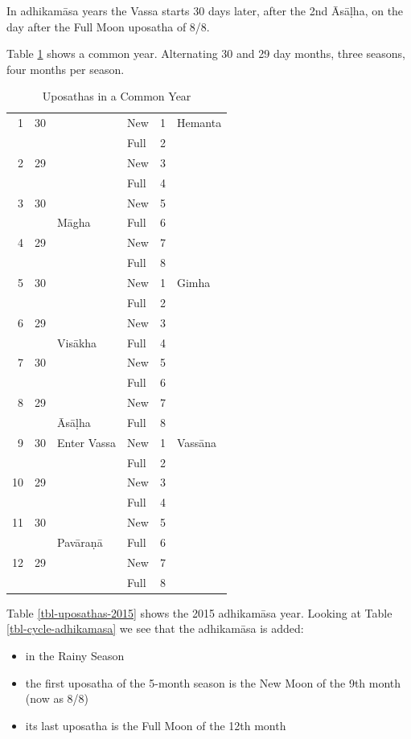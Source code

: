 \documentclass[11pt,oneside]{memoir-article}
\begin{document}
In adhikamāsa years the Vassa starts 30 days later, after the 2nd
Āsāḷha, on the day after the Full Moon uposatha of 8/8.

Table \ref{tbl-common-year} shows a common year. Alternating 30 and 29 day
months, three seasons, four months per season.

\begin{table}[p]
\caption{\label{tbl-common-year} Uposathas in a Common Year}
\centering
\begin{tabular}{rrllrl}
1 & 30 &  & New & 1 & Hemanta\\
 &  &  & Full & 2 & \\
2 & 29 &  & New & 3 & \\
 &  &  & Full & 4 & \\
3 & 30 &  & New & 5 & \\
 &  & Māgha & Full & 6 & \\
4 & 29 &  & New & 7 & \\
 &  &  & Full & 8 & \\
\hline
5 & 30 &  & New & 1 & Gimha\\
 &  &  & Full & 2 & \\
6 & 29 &  & New & 3 & \\
 &  & Visākha & Full & 4 & \\
7 & 30 &  & New & 5 & \\
 &  &  & Full & 6 & \\
8 & 29 &  & New & 7 & \\
 &  & Āsāḷha & Full & 8 & \\
\hline
9 & 30 & Enter Vassa & New & 1 & Vassāna\\
 &  &  & Full & 2 & \\
10 & 29 &  & New & 3 & \\
 &  &  & Full & 4 & \\
11 & 30 &  & New & 5 & \\
 &  & Pavāraṇā & Full & 6 & \\
12 & 29 &  & New & 7 & \\
 &  &  & Full & 8 & \\
\end{tabular}
\end{table}

Table \ref{tbl-uposathas-2015} shows the 2015 adhikamāsa year. Looking at Table
\ref{tbl-cycle-adhikamasa} we see that the adhikamāsa is added:

\begin{itemize}
\item in the Rainy Season
\item the first uposatha of the 5-month season is the New Moon of the 9th month (now as 8/8)
\item its last uposatha is the Full Moon of the 12th month
\end{itemize}
\end{document}
